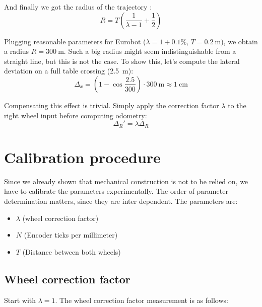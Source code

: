 \documentclass[a4paper]{paper}
\begin{document}
And finally we got the radius of the trajectory :
\begin{equation*}
    R = T \left(\frac{1}{\lambda - 1}  + \frac{1}{2}\right)
\end{equation*}

Plugging reasonable parameters for Eurobot ($\lambda=1+0.1\%$, $T = \SI{0.2}{\meter}$), we obtain a radius $R = \SI{300}{\meter}$. 
Such a big radius might seem indistinguishable from a straight line, but this is not the case.
To show this, let's compute the lateral deviation on a full table crossing (\SI{2.5}{\meter}):
\begin{equation*}
    \Delta_x = \left( 1 - \cos \frac{2.5}{300} \right) \cdot \SI{300}{\meter} \approx \SI{1}{\centi\meter}
\end{equation*}


Compensating this effect is trivial.
Simply apply the correction factor $\lambda$ to the right wheel input before computing odometry:
\begin{equation}
    \Delta_R' = \lambda \Delta_R
\end{equation}

\section{Calibration procedure}
Since we already shown that mechanical construction is not to be relied on, we have to calibrate the parameters experimentally.
The order of parameter determination matters, since they are inter dependent.
The parameters are:
\begin{itemize}
    \item $\lambda$ (wheel correction factor)
    \item $N$ (Encoder ticks per millimeter)
    \item $T$ (Distance between both wheels)
\end{itemize}

\subsection{Wheel correction factor}
Start with $\lambda=1$.
The wheel correction factor measurement is as follows:
\end{document}
